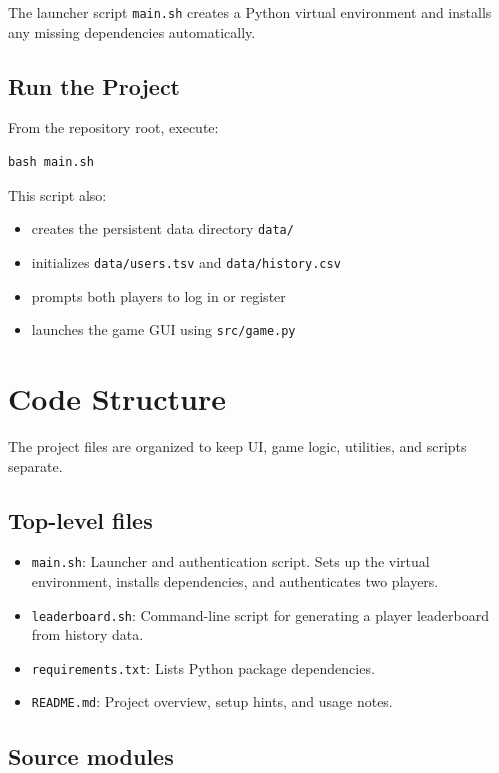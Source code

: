 \documentclass[12pt,a4paper]{article}
\begin{document}
The launcher script \texttt{main.sh} creates a Python virtual environment and installs any missing dependencies automatically.

\subsection{Run the Project}

From the repository root, execute:

\begin{verbatim}
bash main.sh
\end{verbatim}

This script also:

\begin{itemize}
    \item creates the persistent data directory \texttt{data/}
    \item initializes \texttt{data/users.tsv} and \texttt{data/history.csv}
    \item prompts both players to log in or register
    \item launches the game GUI using \texttt{src/game.py}
\end{itemize}

\section{Code Structure}

The project files are organized to keep UI, game logic, utilities, and scripts separate.

\subsection{Top-level files}

\begin{itemize}
    \item \texttt{main.sh}: Launcher and authentication script. Sets up the virtual environment, installs dependencies, and authenticates two players.
    \item \texttt{leaderboard.sh}: Command-line script for generating a player leaderboard from history data.
    \item \texttt{requirements.txt}: Lists Python package dependencies.
    \item \texttt{README.md}: Project overview, setup hints, and usage notes.
\end{itemize}

\subsection{Source modules}
\end{document}
